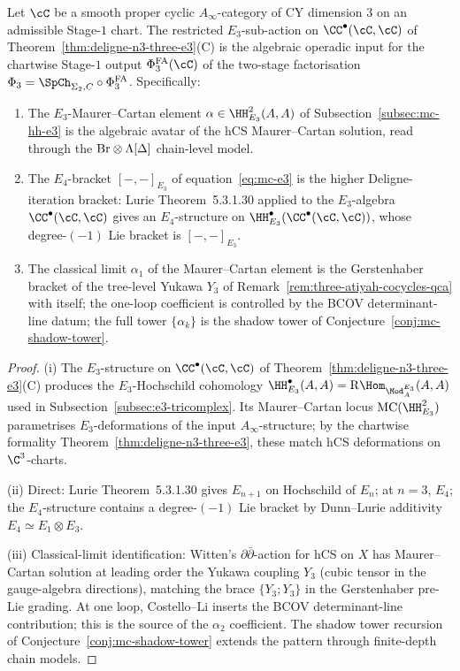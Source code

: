 \begin{theorem}
\label{thm:restricted-e3-feeds-phi-fa-3}
Let $\cC$ be a smooth proper cyclic $A_\infty$-category of CY dimension $3$ on an admissible Stage-$1$ chart. The restricted $E_3$-sub-action on $\CC^\bullet(\cC,\cC)$ of Theorem~\ref{thm:deligne-n3-three-e3}(C) is the algebraic operadic input for the chartwise Stage-$1$ output $\PhiFA_3(\cC)$ of the two-stage factorisation $\Phi_3 = \SpCh_{\Sigma_2, C} \circ \PhiFA_3$. Specifically:
\begin{enumerate}[label=\textup{(\roman*)}]
\item The $E_3$-Maurer--Cartan element $\alpha \in \HH^2_{E_3}(A,A)$ of Subsection~\ref{subsec:mc-hh-e3} is the algebraic avatar of the hCS Maurer--Cartan solution, read through the $\mathrm{Br} \otimes \Lambda[\Delta]$ chain-level model.
\item The $E_4$-bracket $[-,-]_{E_3}$ of equation~\eqref{eq:mc-e3} is the higher Deligne-iteration bracket: Lurie \cite{LurieHA} Theorem~5.3.1.30 applied to the $E_3$-algebra $\CC^\bullet(\cC,\cC)$ gives an $E_4$-structure on $\HH^\bullet_{E_3}(\CC^\bullet(\cC,\cC))$, whose degree-$(-1)$ Lie bracket is $[-,-]_{E_3}$.
\item The classical limit $\alpha_1$ of the Maurer--Cartan element is the Gerstenhaber bracket of the tree-level Yukawa $Y_3$ of Remark~\ref{rem:three-atiyah-cocycles-qca} with itself; the one-loop coefficient is controlled by the BCOV determinant-line datum; the full tower $\{\alpha_k\}$ is the shadow tower of Conjecture~\ref{conj:mc-shadow-tower}.
\end{enumerate}
\end{theorem}

\begin{proof}
(i) The $E_3$-structure on $\CC^\bullet(\cC,\cC)$ of Theorem~\ref{thm:deligne-n3-three-e3}(C) produces the $E_3$-Hochschild cohomology $\HH^\bullet_{E_3}(A,A) = \mathrm{R}\Hom_{\Mod_A^{E_3}}(A,A)$ used in Subsection~\ref{subsec:e3-tricomplex}. Its Maurer--Cartan locus $\mathrm{MC}(\HH^2_{E_3})$ parametrises $E_3$-deformations of the input $A_\infty$-structure; by the chartwise formality Theorem~\ref{thm:deligne-n3-three-e3}, these match hCS deformations on $\C^3$-charts.

(ii) Direct: Lurie \cite{LurieHA} Theorem~5.3.1.30 gives $E_{n+1}$ on Hochschild of $E_n$; at $n = 3$, $E_4$; the $E_4$-structure contains a degree-$(-1)$ Lie bracket by Dunn--Lurie additivity $E_4 \simeq E_1 \otimes E_3$.

(iii) Classical-limit identification: Witten's $\partial\bar\partial$-action for hCS on $X$ has Maurer--Cartan solution at leading order the Yukawa coupling $Y_3$ (cubic tensor in the gauge-algebra directions), matching the brace $\{Y_3; Y_3\}$ in the Gerstenhaber pre-Lie grading. At one loop, Costello--Li \cite{CostelloLi2016} inserts the BCOV determinant-line contribution; this is the source of the $\alpha_2$ coefficient. The shadow tower recursion of Conjecture~\ref{conj:mc-shadow-tower} extends the pattern through finite-depth chain models.
\end{proof}

